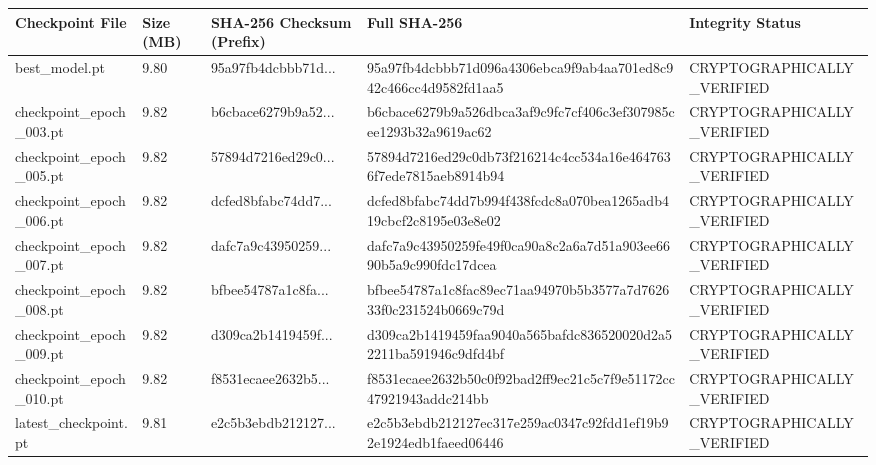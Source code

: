 \begin{tabular}{lllll}
\toprule
Checkpoint File & Size (MB) & SHA-256 Checksum (Prefix) & Full SHA-256 & Integrity Status \\
\midrule
best\_model.pt & 9.80 & 95a97fb4dcbbb71d... & 95a97fb4dcbbb71d096a4306ebca9f9ab4aa701ed8c942c466cc4d9582fd1aa5 & CRYPTOGRAPHICALLY\_VERIFIED \\
checkpoint\_epoch\_003.pt & 9.82 & b6cbace6279b9a52... & b6cbace6279b9a526dbca3af9c9fc7cf406c3ef307985cee1293b32a9619ac62 & CRYPTOGRAPHICALLY\_VERIFIED \\
checkpoint\_epoch\_005.pt & 9.82 & 57894d7216ed29c0... & 57894d7216ed29c0db73f216214c4cc534a16e4647636f7ede7815aeb8914b94 & CRYPTOGRAPHICALLY\_VERIFIED \\
checkpoint\_epoch\_006.pt & 9.82 & dcfed8bfabc74dd7... & dcfed8bfabc74dd7b994f438fcdc8a070bea1265adb419cbcf2c8195e03e8e02 & CRYPTOGRAPHICALLY\_VERIFIED \\
checkpoint\_epoch\_007.pt & 9.82 & dafc7a9c43950259... & dafc7a9c43950259fe49f0ca90a8c2a6a7d51a903ee6690b5a9c990fdc17dcea & CRYPTOGRAPHICALLY\_VERIFIED \\
checkpoint\_epoch\_008.pt & 9.82 & bfbee54787a1c8fa... & bfbee54787a1c8fac89ec71aa94970b5b3577a7d762633f0c231524b0669c79d & CRYPTOGRAPHICALLY\_VERIFIED \\
checkpoint\_epoch\_009.pt & 9.82 & d309ca2b1419459f... & d309ca2b1419459faa9040a565bafdc836520020d2a52211ba591946c9dfd4bf & CRYPTOGRAPHICALLY\_VERIFIED \\
checkpoint\_epoch\_010.pt & 9.82 & f8531ecaee2632b5... & f8531ecaee2632b50c0f92bad2ff9ec21c5c7f9e51172cc47921943addc214bb & CRYPTOGRAPHICALLY\_VERIFIED \\
latest\_checkpoint.pt & 9.81 & e2c5b3ebdb212127... & e2c5b3ebdb212127ec317e259ac0347c92fdd1ef19b92e1924edb1faeed06446 & CRYPTOGRAPHICALLY\_VERIFIED \\
\bottomrule
\end{tabular}
